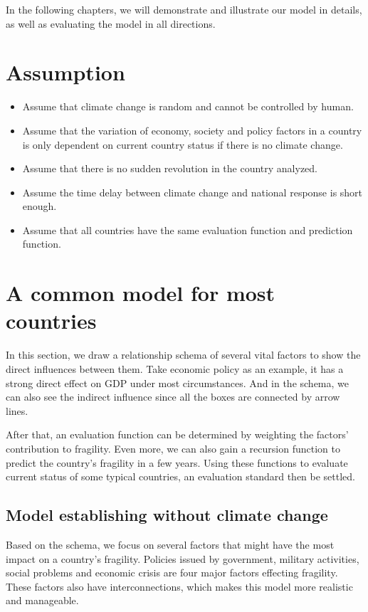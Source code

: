 \documentclass{mcmthesis}
\begin{document}
	In the following chapters, we will demonstrate and illustrate our model in details, as well as evaluating the model in all directions.
	
	\section{Assumption}
	
	\begin{itemize}
		\item Assume that climate change is random and cannot be controlled by human.
		
		\item Assume that the variation of economy, society and policy factors in a country is only dependent on current country status if there is no climate change.
		
		\item Assume that there is no sudden revolution in the country analyzed.
		
		\item Assume the time delay between climate change and national response is short enough.
		
		\item Assume that all countries have the same evaluation function and prediction function.
		
	\end{itemize}
	
	\section{A common model for most countries}
	In this section, we draw a relationship schema of several vital factors to show the direct influences between them. Take economic policy as an example, it has a strong direct effect on GDP under most circumstances. And in the schema, we can also see the indirect influence since all the boxes are connected by arrow lines.
	
	After that, an evaluation function can be determined by weighting the factors’ contribution to fragility. Even more, we can also gain a recursion function to predict the country's fragility in a few years. Using these functions to evaluate current status of some typical countries, an evaluation standard then be settled.
	
	\subsection{Model establishing without climate change}
	Based on the schema, we focus on several factors that might have the most impact on a country's fragility. Policies issued by government, military activities, social problems and economic crisis are four major factors effecting fragility. These factors also have interconnections, which makes this model more realistic and manageable.
	
\end{document}
